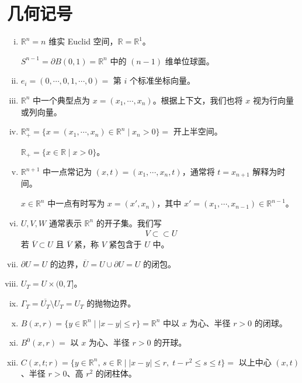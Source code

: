 \documentclass[../main.tex]{subfiles}
\begin{document}
\section{几何记号}\label{section:appA-几何记号}

\begin{enumerate}[(i)]
\item $\mathbb{R}^n=n$ 维实 Euclid 空间，$\mathbb{R}=\mathbb{R}^1$。

$S^{n-1}=\partial B(0,1)=\mathbb{R}^n$ 中的 $(n-1)$ 维单位球面。

\item $e_i=(0,\cdots,0,1,\cdots,0)=$ 第 $i$ 个标准坐标向量。

\item $\mathbb{R}^n$ 中一个典型点为 $x=(x_1,\cdots,x_n)$。根据上下文，我们也将 $x$ 视为行向量或列向量。

\item $\mathbb{R}^n_+=\{x=(x_1,\cdots,x_n)\in\mathbb{R}^n\mid x_n>0\}=$ 开上半空间。

$\mathbb{R}_+=\{x\in\mathbb{R}\mid x>0\}$。

\item $\mathbb{R}^{n+1}$ 中一点常记为 $(x,t)=(x_1,\cdots,x_n,t)$，通常将 $t=x_{n+1}$ 解释为时间。

$x\in\mathbb{R}^n$ 中一点有时写为 $x=(x',x_n)$，其中 $x'=(x_1,\cdots,x_{n-1})\in\mathbb{R}^{n-1}$。

\item $U,V,W$ 通常表示 $\mathbb{R}^n$ 的开子集。我们写
\begin{align*}
V\subset\subset U
\end{align*}
若 $\overline{V}\subset U$ 且 $\overline{V}$ 紧，称 $V$ 紧包含于 $U$ 中。

\item $\partial U=U$ 的边界，$\overline{U}=U\cup\partial U=U$ 的闭包。

\item $U_T=U\times(0,T]$。

\item $\Gamma_T=\overline{U_T}\setminus U_T=U_T$ 的抛物边界。

\item $B(x,r)=\{y\in\mathbb{R}^n\mid|x-y|\leqslant r\}=\mathbb{R}^n$ 中以 $x$ 为心、半径 $r>0$ 的闭球。

\item $B^0(x,r)=$ 以 $x$ 为心、半径 $r>0$ 的开球。

\item $C(x,t;r)=\{y\in\mathbb{R}^n,\,s\in\mathbb{R}\mid|x-y|\leqslant r,\;t-r^2\leqslant s\leqslant t\}=$ 以上中心 $(x,t)$、半径 $r>0$、高 $r^2$ 的闭柱体。


\end{enumerate}
\end{document}
